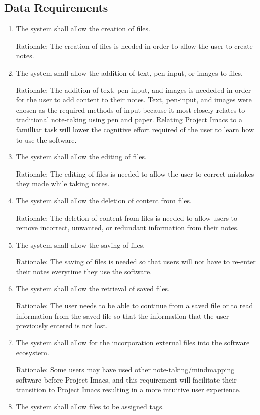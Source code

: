 \documentclass{article}
\begin{document}
\subsection{Data Requirements}
\begin{enumerate}[DR1]
    \item The system shall allow the creation of files.

	Rationale: The creation of files is needed in order to allow the user to create notes.
	\item The system shall allow the addition of text, pen-input, or images to files.

	Rationale: The addition of text, pen-input, and images is neededed in order for the user to add content to their notes. Text, pen-input, and images were chosen as the required methods of input because it most closely relates to traditional note-taking using pen and paper. Relating Project Imacs to a familliar task will lower the cognitive effort required of the user to learn how to use the software.
    \item The system shall allow the editing of files.

	Rationale: The editing of files is needed to allow the user to correct mistakes they made while taking notes.
	\item The system shall allow the deletion of content from files.

	Rationale: The deletion of content from files is needed to allow users to remove incorrect, unwanted, or redundant information from their notes.
    \item The system shall allow the saving of files.

	Rationale: The saving of files is needed so that users will not have to re-enter their notes everytime they use the software.
    \item The system shall allow the retrieval of saved files.

	Rationale: The user needs to be able to continue from a saved file or to read information from the saved file so that the information that the user previously entered is not lost.
    \item The system shall allow for the incorporation external files into the software ecosystem.

	Rationale: Some users may have used other note-taking/mindmapping software before Project Imacs, and this requirement will facilitate their transition to Project Imacs resulting in a more intuitive user experience.
    \item The system shall allow files to be assigned tags.


\end{enumerate}
\end{document}
